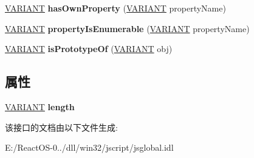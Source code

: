 \begin{DoxyCompactItemize}
\item 
\mbox{\label{interface_j_s_global_1_1_array_instance_a86b150d5250385882b9d4e974f4a2936}} 
\hyperlink{structtag_v_a_r_i_a_n_t}{V\+A\+R\+I\+A\+NT} {\bfseries has\+Own\+Property} (\hyperlink{structtag_v_a_r_i_a_n_t}{V\+A\+R\+I\+A\+NT} property\+Name)
\item 
\mbox{\label{interface_j_s_global_1_1_array_instance_a9f13f6682628c623c9010746a7bca452}} 
\hyperlink{structtag_v_a_r_i_a_n_t}{V\+A\+R\+I\+A\+NT} {\bfseries property\+Is\+Enumerable} (\hyperlink{structtag_v_a_r_i_a_n_t}{V\+A\+R\+I\+A\+NT} property\+Name)
\item 
\mbox{\label{interface_j_s_global_1_1_array_instance_a7deeefb1e3cd2f71cf6f462303e257db}} 
\hyperlink{structtag_v_a_r_i_a_n_t}{V\+A\+R\+I\+A\+NT} {\bfseries is\+Prototype\+Of} (\hyperlink{structtag_v_a_r_i_a_n_t}{V\+A\+R\+I\+A\+NT} obj)
\end{DoxyCompactItemize}
\subsection*{属性}
\begin{DoxyCompactItemize}
\item 
\mbox{\label{interface_j_s_global_1_1_array_instance_a5c606ccbfc318618ba0d886a9a2c7a34}} 
\hyperlink{structtag_v_a_r_i_a_n_t}{V\+A\+R\+I\+A\+NT} {\bfseries length}
\end{DoxyCompactItemize}


该接口的文档由以下文件生成\+:\begin{DoxyCompactItemize}
\item 
E\+:/\+React\+O\+S-\/0../dll/win32/jscript/jsglobal.\+idl\end{DoxyCompactItemize}
